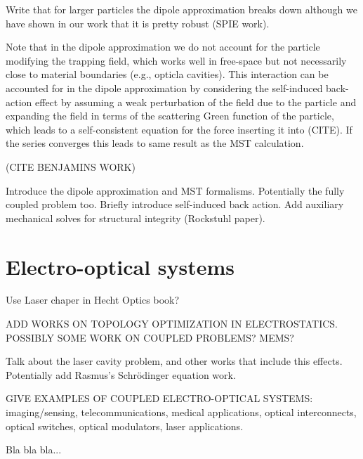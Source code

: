 Write that for larger particles the dipole approximation breaks down
although we have shown in our work that it is pretty robust (SPIE work).



Note that in the dipole approximation we do not account for the particle modifying
the trapping field, which works well in free-space but not necessarily close to material
boundaries (e.g., opticla cavities). This interaction can be accounted for in the dipole
approximation by considering the self-induced back-action effect by assuming a weak
perturbation of the field due to the particle and expanding the field in terms of 
the scattering Green function of the particle, which leads to a self-consistent
equation for the force inserting it into (CITE). If the series converges this leads 
to same result as the MST calculation. 

(CITE BENJAMINS WORK)

Introduce the dipole approximation and MST formalisms. Potentially the fully coupled problem too.
Briefly introduce self-induced back action.
Add auxiliary mechanical solves for structural integrity (Rockstuhl paper).

\section{Electro-optical systems}

Use Laser chaper in Hecht Optics book?

ADD WORKS ON TOPOLOGY OPTIMIZATION IN ELECTROSTATICS. POSSIBLY SOME WORK
ON COUPLED PROBLEMS? MEMS?

Talk about the laser cavity problem, and other works that include this effects.
Potentially add Rasmus's Schrödinger equation work.


GIVE EXAMPLES OF COUPLED ELECTRO-OPTICAL SYSTEMS: imaging/sensing, telecommunications,
medical applications, optical interconnects, optical switches, optical modulators,
laser applications.

Bla bla bla...